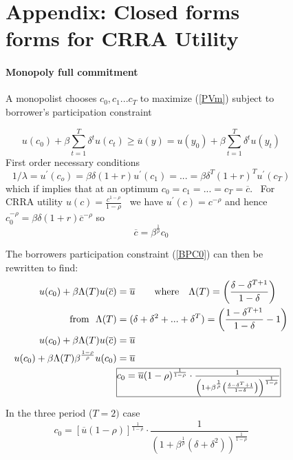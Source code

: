 \documentclass[11pt]{article}%
\begin{document}
\begin{figure}
{\section{Appendix: Closed forms forms for CRRA Utility}

\appendix


\paragraph{Monopoly full commitment}

A monopolist chooses $c_{0},c_{1}...c_{T}$ to maximize (\ref{PVm}) subject to
borrower's participation constraint%

\begin{equation}
u(c_{0})+\beta%
{\displaystyle\sum\limits_{t=1}^{T}}
\delta^{t}u\left(  c_{t}\right)  \geq\overline{u}(y)=u(y_{0})+\beta%
{\displaystyle\sum\limits_{t=1}^{T}}
\delta^{t}u\left(  y_{t}\right)  \label{BPC0}%
\end{equation}
First order necessary conditions
\[
1/\lambda=u^{\prime}(c_{o})=\beta\delta(1+r)u^{\prime}(c_{1})=...=\beta
\delta^{T}(1+r)^{T}u^{\prime}(c_{T})
\]
which if  implies that at an optimum $c_{0}%
=c_{1}=...=c_{T}=\overline{c}.$ \ For CRRA utility $u(c)=\frac{c^{1-\rho}%
}{1-\rho}$ \ we have $u^{\prime}(c)=c^{-\rho}$ and hence $c_{0}^{-\rho}%
=\beta\delta(1+r)\overline{c}^{-\rho}$ so
\[
\overline{c}=\beta^{\frac{1}{\rho}}c_{0}%
\]


The borrowers participation constraint (\ref{BPC0}) can then be rewritten to
find:%
\begin{align*}
u(c_{0})+\beta\Lambda(T)u(\overline{c})  &  =\overline{u}\text{
\ \ \ \ \ where \ \ }\Lambda(T)=\left(  \frac{\delta-\delta^{T+1}}{1-\delta
}\right) \\
\text{from \ }\Lambda(T)  &  =(\delta+\delta^{2}+...+\delta^{T})=\left(
\frac{1-\delta^{T+1}}{1-\delta}-1\right) \\
u(c_{0})+\beta\Lambda(T)u(\overline{c})  &  =\overline{u}\\
u(c_{0})+\beta\Lambda(T)\beta^{\frac{1-\rho}{\rho}}u(c_{0})  &  =\overline
{u}\\
&  \frame{$c_0=\overline{u}(1-\rho)^\frac{1}{1-\rho}\cdot\frac{1}{\left(
1+\beta^\frac{1}{\rho}\left(  \frac{\delta-\delta^T+1}{1-\delta}\right)
\right)  ^\frac{1}{1-\rho}}$}\text{ }%
\end{align*}
In the three period ($T=2)$ case
\[
c_{0}=\left[  \overline{u}(1-\rho)\right]  ^{\frac{1}{1-\rho}}\cdot\frac
{1}{(1+\beta^{\frac{1}{\rho}}\left(  \delta+\delta^{2}\right)  )^{\frac
{1}{1-\rho}}}%
\]


}
\end{figure}
\end{document}
